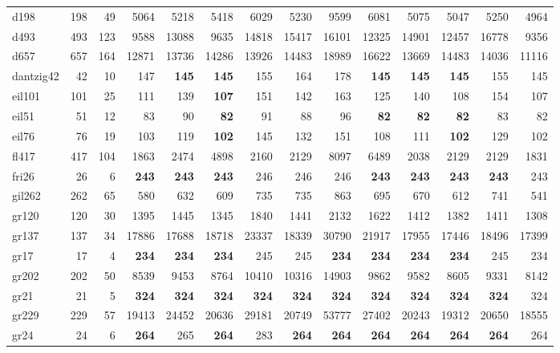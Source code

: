 {\begin{longtable}{l r r r r r r r r r r r r r}
d198 & 198 & 49 & 5064 & 5218 & 5418 & 6029 & 5230 & 9599 & 6081 & 5075 & 5047 & 5250 & 4964 \\
d493 & 493 & 123 & 9588 & 13088 & 9635 & 14818 & 15417 & 16101 & 12325 & 14901 & 12457 & 16778 & 9356 \\
d657 & 657 & 164 & 12871 & 13736 & 14286 & 13926 & 14483 & 18989 & 16622 & 13669 & 14483 & 14036 & 11116 \\
dantzig42 & 42 & 10 & 147 & \textbf{145} & \textbf{145} & 155 & 164 & 178 & \textbf{145} & \textbf{145} & \textbf{145} & 155 & 145 \\
eil101 & 101 & 25 & 111 & 139 & \textbf{107} & 151 & 142 & 163 & 125 & 140 & 108 & 154 & 107 \\
eil51 & 51 & 12 & 83 & 90 & \textbf{82} & 91 & 88 & 96 & \textbf{82} & \textbf{82} & \textbf{82} & 83 & 82 \\
eil76 & 76 & 19 & 103 & 119 & \textbf{102} & 145 & 132 & 151 & 108 & 111 & \textbf{102} & 129 & 102 \\
fl417 & 417 & 104 & 1863 & 2474 & 4898 & 2160 & 2129 & 8097 & 6489 & 2038 & 2129 & 2129 & 1831 \\
fri26 & 26 & 6 & \textbf{243} & \textbf{243} & \textbf{243} & 246 & 246 & 246 & \textbf{243} & \textbf{243} & \textbf{243} & \textbf{243} & 243 \\
gil262 & 262 & 65 & 580 & 632 & 609 & 735 & 735 & 863 & 695 & 670 & 612 & 741 & 541 \\
gr120 & 120 & 30 & 1395 & 1445 & 1345 & 1840 & 1441 & 2132 & 1622 & 1412 & 1382 & 1411 & 1308 \\
gr137 & 137 & 34 & 17886 & 17688 & 18718 & 23337 & 18339 & 30790 & 21917 & 17955 & 17446 & 18496 & 17399 \\
gr17 & 17 & 4 & \textbf{234} & \textbf{234} & \textbf{234} & 245 & 245 & \textbf{234} & \textbf{234} & \textbf{234} & \textbf{234} & 245 & 234 \\
gr202 & 202 & 50 & 8539 & 9453 & 8764 & 10410 & 10316 & 14903 & 9862 & 9582 & 8605 & 9331 & 8142 \\
gr21 & 21 & 5 & \textbf{324} & \textbf{324} & \textbf{324} & \textbf{324} & \textbf{324} & \textbf{324} & \textbf{324} & \textbf{324} & \textbf{324} & \textbf{324} & 324 \\
gr229 & 229 & 57 & 19413 & 24452 & 20636 & 29181 & 20749 & 53777 & 27402 & 20243 & 19312 & 20650 & 18555 \\
gr24 & 24 & 6 & \textbf{264} & 265 & \textbf{264} & 283 & \textbf{264} & \textbf{264} & \textbf{264} & \textbf{264} & \textbf{264} & \textbf{264} & 264 \\

\end{longtable}}

